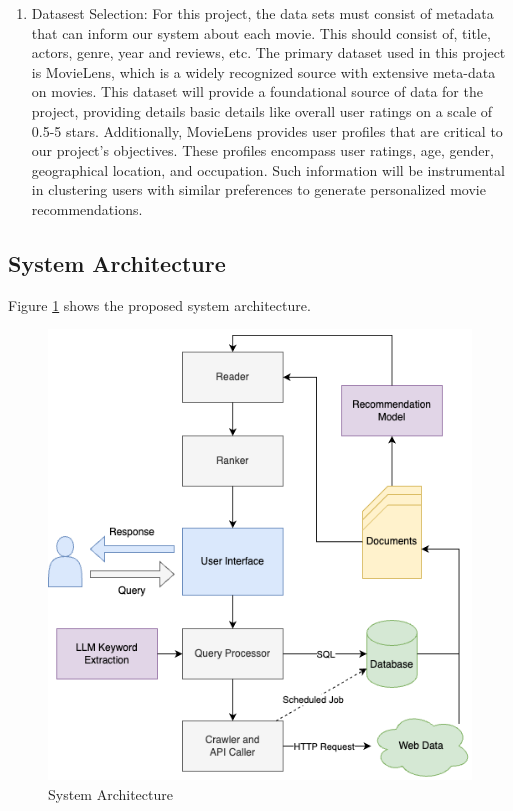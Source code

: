 \documentclass[journal]{IEEEtran}
\begin{document}
\begin{enumerate}
    \item{Datasest Selection}: For this project, the data sets must consist of metadata that can inform our system about each movie. This should consist of, title, actors, genre, year and reviews, etc. The primary dataset used in this project is MovieLens, which is a widely recognized source with extensive meta-data on movies. This dataset will provide a foundational source of data for the project, providing details basic details like overall user ratings on a scale of 0.5-5 stars. Additionally, MovieLens provides user profiles that are critical to our project's objectives. These profiles encompass user ratings, age, gender, geographical location, and occupation. Such information will be instrumental in clustering users with similar preferences to generate personalized movie recommendations.

    
\end{enumerate}

\subsection{System Architecture}
Figure \ref{fig:sysarch} shows the proposed system architecture.

\begin{figure}
    \centering
    \includegraphics[width=1.0\linewidth]{doc//proposal//assets/sysarch.drawio.png}
    \caption{System Architecture}
    \label{fig:sysarch}
\end{figure}
\end{document}
